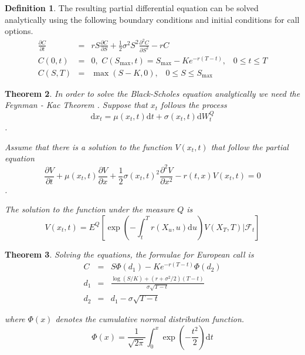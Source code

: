 \documentclass[12pt, oneside]{book}
\theoremstyle{plain}
\newtheorem{theorem}{Theorem}[section]
\theoremstyle{definition}
\newtheorem{definition}[theorem]{Definition}
\begin{document}
\begin{definition}\label{bsBase} The resulting partial differential equation can be solved analytically using the following boundary conditions and initial conditions for call options.
\begin{eqnarray}
\frac{\partial C}{\partial t} &=& rS\frac{\partial C}{\partial S}+\frac{1}{2} \sigma^2 S^2 \frac{\partial^2 C}{\partial S^2} - rC \\[10pt]
C(0,t) &=& 0, \hspace{4pt} C(S_{\max},t)=S_{\max} - K e^{-r(T-t)}, \hspace{10pt} 0 \leq t \leq T \\[10pt]
C(S,T) &=& \max(S-K,0), \hspace{10pt} 0 \leq S \leq S_{\max}
\end{eqnarray}
\end{definition}

\begin{theorem}\label{Feynman}
In order to solve the Black-Scholes equation analytically we need the Feynman - Kac Theorem \cite{klebaner}. Suppose that $x_t$ follows the process
\begin{equation}
\mathrm{d} x_t = \mu(x_t, t)  \mathrm{d}t + \sigma(x_t, t) \mathrm{d} W_t^Q
\end{equation}.

Assume that there is a solution to the function $V(x_t, t)$ that follow the partial equation
\begin{equation}
\frac{\partial V}{\partial t} +  \mu(x_t, t) \frac{\partial V}{\partial x} + \frac{1}{2} \sigma(x_t, t)^2 \frac{\partial^2 V}{\partial x^2} - r(t, x) V(x_t, t) = 0
\end{equation}.

The solution to the function under the measure $Q$ is
\begin{equation}
V(x_t, t) = E^Q [ \exp(-  \int_{t}^{T} r(X_u, u)  \mathrm{d}u) V(X_T, T) \lvert \mathcal{F}_t]
\end{equation}

\end{theorem}

\begin{theorem}\label{bsAnal} 
Solving the equations, the formulae \cite{wilmott} for European call is
\begin{eqnarray}
C &=& S \Phi (d_1) - K e^{-r(T-t)} \Phi (d_2) \\[10pt]
d_1 &=& \frac{\log(S/K) + (r + \sigma^2/2)(T - t)}{\sigma \sqrt{T-t}} \\[10pt]
d_2 &=& d_1 - \sigma \sqrt{T-t}
\end{eqnarray}

where $\Phi(x)$ denotes the cumulative normal distribution function.
\begin{equation}
\Phi(x) = \frac{1}{\sqrt{2 \pi}} \int_0^x \exp (-\frac{t^2}{2}) \mathrm{d}t
\end{equation}
\end{theorem}
\end{document}
